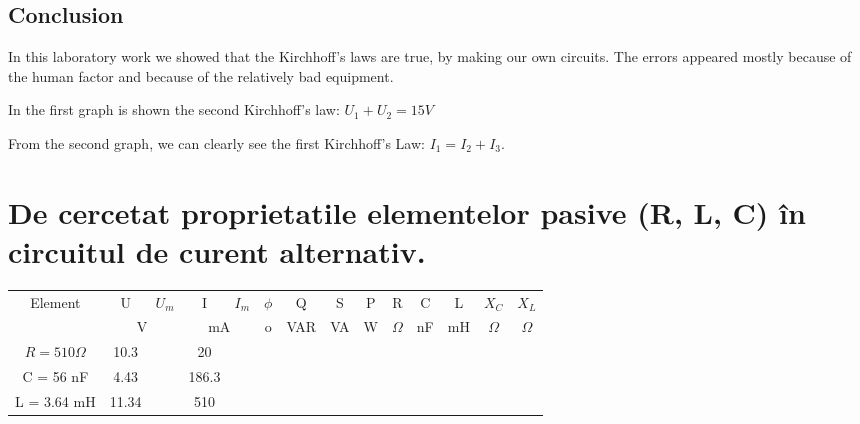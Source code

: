 \documentclass{article}
\begin{document}

			\subsection{Conclusion}
				In this laboratory work we showed that the Kirchhoff's laws are true, by making our own circuits. The errors appeared mostly because of the human factor and because of the relatively bad equipment.
				\par In the first graph is shown the second Kirchhoff's law: \(U_1 + U_2 = 15V\)
				\par From the second graph, we can clearly see the first Kirchhoff's Law: \(I_1 = I_2 + I_3\).
				

	\newpage
	\section{De cercetat proprietatile elementelor pasive (R, L, C) în circuitul de curent alternativ.}

		\begin{center} \begin{tabular}{|c|c|c|c|c|c|c|c|c|c|c|c|c|c|}
			\hline
			
			\multirow{2}{*}{Element} & U & $U_m$ & I & $I_m$ & $\phi$ & Q & S & P & R & C & L & $X_C$ & $X_L$\\
			\arrayrulecolor{gray!70}
			\cline{2-14}
			\arrayrulecolor{black}
			
			& \multicolumn{2}{c|}{V} & \multicolumn{2}{c|}{mA} & o & VAR & VA & W & $\Omega$ & nF & mH & $\Omega$ & $\Omega$\\
			\hline
			
			$R = 510 \Omega$ & 10.3 & & 20 &  & & & & & & & & &\\
			\hline
			
			C = 56 nF & 4.43 & & 186.3 & & & & & & & & & &\\
			\hline
			
			L = 3.64 mH & 11.34 & & 510 & & & & & & & & & &\\
			\hline
		\end{tabular} \end{center}

\end{document}
